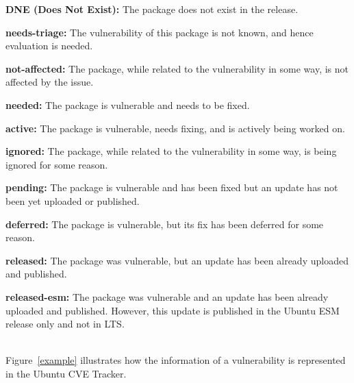 \documentclass[a4paper,num-refs]{oup-contemporary}
\begin{document}
{\textbf{DNE (Does Not Exist):} The package does not exist in the
		release.

\textbf{needs-triage:} The vulnerability of this package
		is not known, and hence evaluation is needed.

\textbf{not-affected:} The package, while related to the
		vulnerability in some way, is not affected by the issue.

\textbf{needed:} The package is vulnerable and needs to be fixed.

\textbf{active:} The package is vulnerable, needs fixing, and is 
                 actively being worked on.

\textbf{ignored:} The package, while related to the
		vulnerability in some way, is being ignored for some reason. 

\textbf{pending:} The package is vulnerable and
                  has been fixed but an update has not been yet uploaded or
		  published.

\textbf{deferred:} The package is vulnerable, but 
                   its fix has been deferred for some reason. 

\textbf{released:} The package was vulnerable, but
		an update has been already uploaded and published.

\textbf{released-esm:} The package was vulnerable and
		an update has been already uploaded and published. However,
		this update is published in the Ubuntu ESM release only and not in LTS.}
\newlne\\
Figure~\ref{example} illustrates how the information of a vulnerability is represented
in the Ubuntu CVE Tracker.
\end{document}
